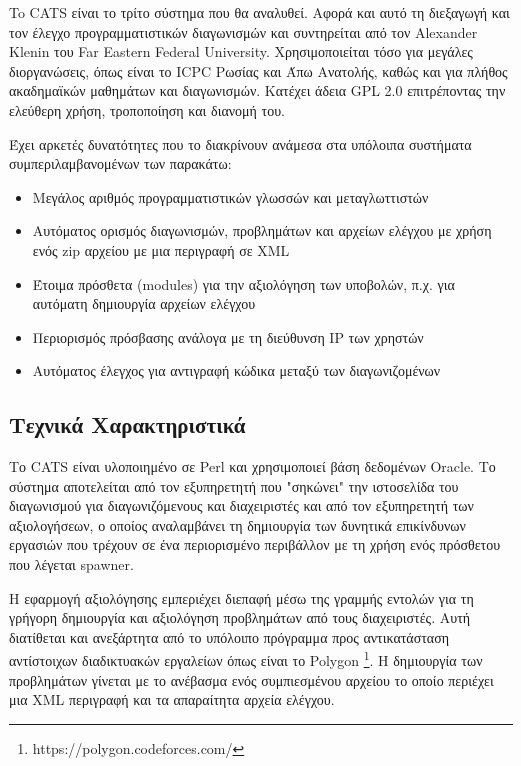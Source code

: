 \documentclass[diploma]{softlab-thesis}
\begin{document}
To CATS είναι το τρίτο σύστημα που θα αναλυθεί. Αφορά και αυτό τη διεξαγωγή και
τον έλεγχο προγραμματιστικών διαγωνισμών και συντηρείται από τον Alexander Klenin
του Far Eastern Federal University. Χρησιμοποιείται τόσο για μεγάλες διοργανώσεις,
όπως είναι το ICPC Ρωσίας και Άπω Ανατολής, καθώς και για πλήθος ακαδημαϊκών
μαθημάτων και διαγωνισμών. Κατέχει άδεια GPL 2.0 επιτρέποντας την ελεύθερη
χρήση, τροποποίηση και διανομή του.

\bigskip

Έχει αρκετές δυνατότητες που το διακρίνουν ανάμεσα στα υπόλοιπα συστήματα
συμπεριλαμβανομένων των παρακάτω:

\begin{itemize}
    \item Μεγάλος αριθμός προγραμματιστικών γλωσσών και μεταγλωττιστών
    \item Αυτόματος ορισμός διαγωνισμών, προβλημάτων και αρχείων ελέγχου με χρήση
      ενός zip αρχείου με μια περιγραφή σε XML
    \item Έτοιμα πρόσθετα (modules) για την αξιολόγηση των υποβολών, π.χ. για
      αυτόματη δημιουργία αρχείων ελέγχου
    \item Περιορισμός πρόσβασης ανάλογα με τη διεύθυνση IP των χρηστών
    \item Αυτόματος έλεγχος για αντιγραφή κώδικα μεταξύ των διαγωνιζομένων
\end{itemize}

\subsection{Τεχνικά Χαρακτηριστικά}

Το CATS είναι υλοποιημένο σε Perl και χρησιμοποιεί βάση δεδομένων Oracle. Το
σύστημα αποτελείται από τον εξυπηρετητή που "σηκώνει" την ιστοσελίδα του
διαγωνισμού για διαγωνιζόμενους και διαχειριστές και από τον εξυπηρετητή των
αξιολογήσεων, ο οποίος αναλαμβάνει τη δημιουργία των δυνητικά επικίνδυνων
εργασιών που τρέχουν σε ένα περιορισμένο περιβάλλον με τη χρήση ενός πρόσθετου
που λέγεται spawner.

\bigskip

Η εφαρμογή αξιολόγησης εμπεριέχει διεπαφή μέσω της γραμμής εντολών για τη
γρήγορη δημιουργία και αξιολόγηση προβλημάτων από τους διαχειριστές. Αυτή
διατίθεται και ανεξάρτητα από το υπόλοιπο πρόγραμμα προς αντικατάσταση
αντίστοιχων διαδικτυακών εργαλείων όπως είναι το Polygon
\footnote{https://polygon.codeforces.com/}. Η δημιουργία των προβλημάτων
γίνεται με το ανέβασμα ενός συμπιεσμένου αρχείου το οποίο περιέχει μια XML
περιγραφή και τα απαραίτητα αρχεία ελέγχου.
\end{document}
